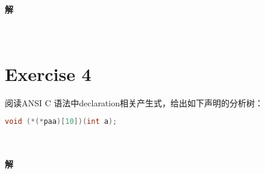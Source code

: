 \documentclass{article}
\begin{document}
\paragraph{解}
\\

\section{Exercise 4}
阅读ANSI C 语法中declaration相关产生式，给出如下声明的分析树：
\begin{lstlisting}[language = C++, 
         keywordstyle=\bfseries\color{blue!70},
         commentstyle=\color{red!40!green!60!blue},
         frame=shadowbox,
         rulesepcolor=\color{red!20!green!30!blue!20},
         basicstyle=\ttfamily]
  void (*(*paa)[10])(int a);
\end{lstlisting}
\\
\paragraph{解}
\\
\end{document}
